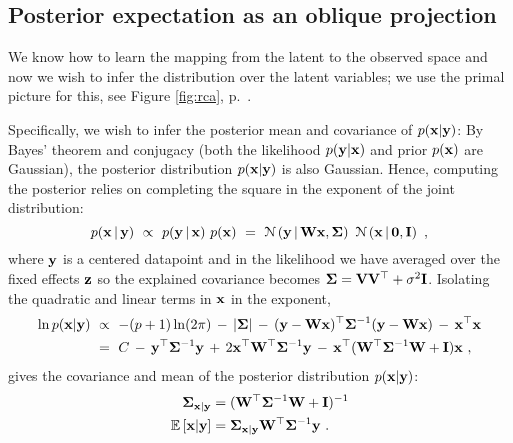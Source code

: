 
    \subsection{Posterior expectation as an oblique projection} \label{subsec:chap3_RCA_posterior}
      We know how to learn the mapping from the latent to the observed space and now we wish to infer the distribution over the latent variables; we use the primal picture for this, see Figure \ref{fig:rca}, p.~\pageref{fig:rca}.

      Specifically, we wish to infer the posterior mean and covariance of $p(\mathbf{x}|\mathbf{y})$: By Bayes' theorem and conjugacy (both the likelihood $p(\mathbf{y}|\mathbf{x})$ and prior $p(\mathbf{x})$ are Gaussian), the posterior distribution $p(\mathbf{x}|\mathbf{y})$ is also Gaussian. Hence, computing the posterior relies on completing the square in the exponent of the joint distribution:
      \begin{equation*}
	p(\mathbf{x} \,|\, \mathbf{y}) ~\propto~ p(\mathbf{y} \,|\, \mathbf{x}) ~ p(\mathbf{x})
	~=~ \mathcal{N} \left( \mathbf{y} \,|\, \mathbf{W}\mathbf{x}, \mathbf{\Sigma} \right) ~ \mathcal{N} \left( \mathbf{x} \,|\, \mathbf{0}, \mathbf{I} \right) ~,
      \end{equation*}
      where $\mathbf{y}$ is a centered datapoint and in the likelihood we have averaged over the fixed effects $\mathbf{z}$ so the explained covariance becomes $\mathbf{\Sigma} = \mathbf{V}\mathbf{V}^\top + \sigma^2\mathbf{I}$. Isolating the quadratic and linear terms in $\mathbf{x}$ in the exponent,
      \begin{equation*}
	\begin{split}
	  \ln p(\mathbf{x} | \mathbf{y}) ~ &\propto ~ -(p+1)\ln(2\pi) \,-\, \lvert \mathbf{\Sigma} \rvert \,-\, (\mathbf{y}-\mathbf{W}\mathbf{x})^\top \mathbf{\Sigma}^{-1}(\mathbf{y}-\mathbf{W}\mathbf{x}) \,-\, \mathbf{x}^\top\mathbf{x}  \\
	  &= ~ C \,-\, \mathbf{y}^\top \mathbf{\Sigma}^{-1} \mathbf{y} \,+\, 2\mathbf{x}^\top \mathbf{W}^\top \mathbf{\Sigma}^{-1} \mathbf{y} \,-\, \mathbf{x}^\top(\mathbf{W}^\top \mathbf{\Sigma}^{-1}\mathbf{W} + \mathbf{I})\mathbf{x} ~,
	\end{split}
      \end{equation*}
      gives the covariance and mean of the posterior distribution $p(\mathbf{x}|\mathbf{y})$:
      \begin{equation} \label{equ:chap3_posterior}
	\begin{split}
	  \mathbf{\Sigma}_{\mathbf{x}|\mathbf{y}} &= (\mathbf{W}^\top \mathbf{\Sigma}^{-1} \mathbf{W} + \mathbf{I})^{-1} \\
	  \mathbb{E}\left[\mathbf{x}|\mathbf{y}\right] &=  \mathbf{\Sigma}_{\mathbf{x}|\mathbf{y}} \mathbf{W}^\top\mathbf{\Sigma}^{-1}\mathbf{y} ~.
	\end{split}
      \end{equation}

